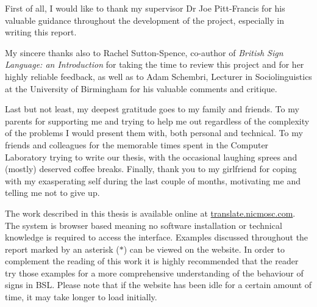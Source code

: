 \documentclass[12pt]{ociamthesis}  %
\let\mtcleardoublepage\cleardoublepage
\renewcommand{\cleardoublepage}{\clearpage{\pagestyle{plain}\mtcleardoublepage}}
\begin{document}
\begin{acknowledgements}
First of all, I would like to thank my supervisor Dr Joe Pitt-Francis for his valuable guidance throughout the development of the project, especially in writing this report.

My sincere thanks also to Rachel Sutton-Spence, co-author of \textit{British Sign Language: an Introduction} for taking the time to review this project and for her highly reliable feedback, as well as to Adam Schembri, Lecturer in Sociolinguistics at the University of Birmingham for his valuable comments and critique.

Last but not least, my deepest gratitude goes to my family and friends. To my parents for supporting me and trying to help me out regardless of the complexity of the problems I would present them with, both personal and technical. To my friends and colleagues for the memorable times spent in the Computer Laboratory trying to write our thesis, with the occasional laughing sprees and (mostly) deserved coffee breaks. Finally, thank you to my girlfriend for coping with my exasperating self during the last couple of months, motivating me and telling me not to give up.

\end{acknowledgements}

\begin{notes}
The work described in this thesis is available online at \url{translate.nicmosc.com}. The system is browser based meaning no software installation or technical knowledge is required to access the interface. Examples discussed throughout the report marked by an asterisk ($\ast$) can be viewed on the website. In order to complement the reading of this work it is highly recommended that the reader try those examples for a more comprehensive understanding of the behaviour of signs in BSL. Please note that if the website has been idle for a certain amount of time, it may take longer to load initially.
\end{notes}

{\pagestyle{plain}
	\begin{romanpages}          %
	\setcounter{tocdepth}{2}
	\setcounter{secnumdepth}{3}
	{
	\tableofcontents            %
	}
	\listoffigures              %
	\listoftables
	\end{romanpages}            %
\cleardoublepage}
\end{document}
